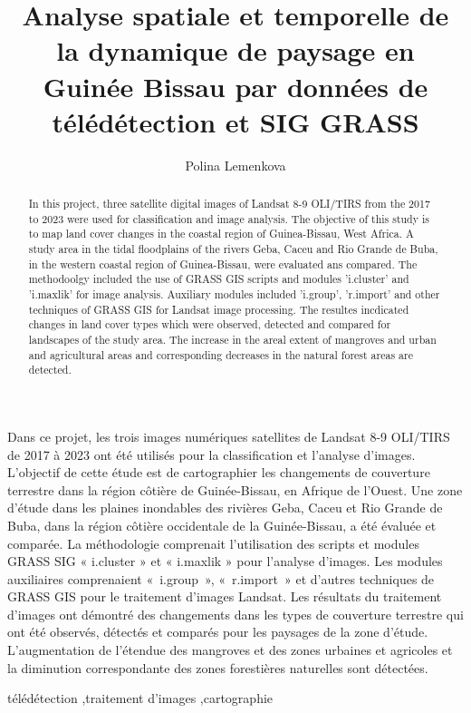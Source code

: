 \documentclass{rfpt}
\begin{document}
\begin{frontmatter}



\title{Analyse spatiale et temporelle de la dynamique de paysage en Guinée Bissau par données de télédétection et SIG GRASS}

\author[A1]{Polina Lemenkova}

\address[A1]{Department of Geoinformatics, Paris Lodron Universität Salzburg, Schillerstraße 30, A-5020 Salzburg, Austria. ORCID: https://orcid.org/0000-0002-5759-1089}

\begin{resume}
Dans ce projet, les trois images numériques satellites de Landsat 8-9 OLI/TIRS de 2017 à 2023 ont été utilisés pour la classification et l’analyse d’images. L'objectif de cette étude est de cartographier les changements de couverture terrestre dans la région côtière de Guinée-Bissau, en Afrique de l'Ouest. Une zone d'étude dans les plaines inondables des rivières Geba, Caceu et Rio Grande de Buba, dans la région côtière occidentale de la Guinée-Bissau, a été évaluée et comparée. La méthodologie comprenait l'utilisation des scripts et modules GRASS SIG « i.cluster » et « i.maxlik » pour l'analyse d'images. Les modules auxiliaires comprenaient « i.group », « r.import » et d'autres techniques de GRASS GIS pour le traitement d'images Landsat. Les résultats du traitement d'images ont démontré des changements dans les types de couverture terrestre qui ont été observés, détectés et comparés pour les paysages de la zone d'étude. L'augmentation de l'étendue des mangroves et des zones urbaines et agricoles et la diminution correspondante des zones forestières naturelles sont détectées.
\end{resume}


\begin{motscle}
télédétection \sep traitement d'images \sep cartographie
\end{motscle}

\begin{abstract}
In this project, three satellite digital images of Landsat 8-9 OLI/TIRS from the 2017 to 2023 were used for classification and image analysis. The objective of this study is to map land cover changes in the coastal region of Guinea-Bissau, West Africa. A study area in the tidal floodplains of the rivers Geba, Caceu and Rio Grande de Buba, in the western coastal region of Guinea-Bissau, were evaluated ans compared. The methodoolgy included the use of GRASS GIS scripts and modules 'i.cluster' and 'i.maxlik' for image analysis. Auxiliary modules included 'i.group', 'r.import' and other techniques of GRASS GIS for Landsat image processing. The resultes incdicated changes in land cover types which were observed, detected and compared for landscapes of the study area. The increase in the areal extent of mangroves and urban and agricultural areas and corresponding decreases in the natural forest areas are detected.
\end{abstract}


\end{frontmatter}
\end{document}
